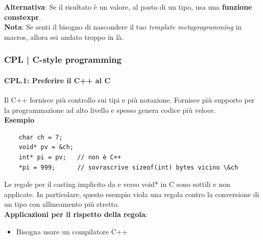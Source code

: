 \textsf{\small \textbf{Alternativa}: Se il risultato è un valore, al posto di un tipo, usa una \textbf{funzione constexpr}.} \\

\textsf{\small \textbf{Nota}: Se senti il bisogno di nascondere il tuo \emph{template metaprogramming} in macros, allora sei andato troppo in là.} \\



\newpage

\subsubsection{CPL | C-style programming}

\paragraph{CPL.1: Preferire il C++ al C}

\textsf{\small Il C++ fornisce più controllo sui tipi e più notazione. Fornisce più supporto per la programmazione ad alto livello e spesso genera codice più veloce.} \\

\textsf{\small \textbf{Esempio} }

\begin{lstlisting}
	char ch = 7;
	void* pv = &ch;
	int* pi = pv;   // non è C++
	*pi = 999;      // sovrascrive sizeof(int) bytes vicino \&ch
\end{lstlisting}

\textsf{\small Le regole per il casting implicito da e verso void* in C sono sottili e non applicate. In particolare, questo esempio viola una regola contro la conversione di un tipo con allineamento più stretto.} \\ %

\textsf{\small \textbf{Applicazioni per il rispetto della regola}: }

\begin{itemize}
	\item \textsf{\small Bisogna usare un compilatore C++}
\end{itemize}

